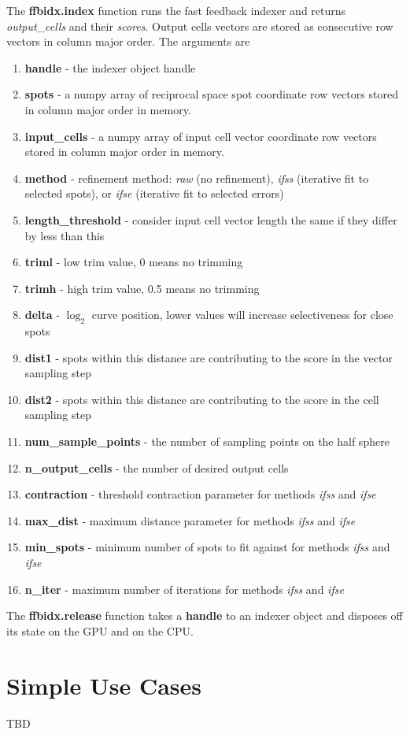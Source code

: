 \documentclass[a4paper,10pt]{article}
\begin{document}
The \textbf{ffbidx.index} function runs the fast feedback indexer and returns \emph{output\_cells} and their \emph{scores}. Output cells vectors are stored as consecutive row vectors in column major order. The arguments are
%
\begin{enumerate}
 \item \textbf{handle} - the indexer object handle
 \item \textbf{spots} - a numpy array of reciprocal space spot coordinate row vectors stored in column major order in memory.
 \item \textbf{input\_cells} - a numpy array of input cell vector coordinate row vectors stored in column major order in memory.
 \item \textbf{method} - refinement method: \emph{raw} (no refinement), \emph{ifss} (iterative fit to selected spots), or \emph{ifse} (iterative fit to selected errors)
 \item \textbf{length\_threshold} - consider input cell vector length the same if they differ by less than this
 \item \textbf{triml} - low trim value, 0 means no trimming
 \item \textbf{trimh} - high trim value, 0.5 means no trimming
 \item \textbf{delta} - $\log_2$ curve position, lower values will increase selectiveness for close spots
 \item \textbf{dist1} - spots within this distance are contributing to the score in the vector sampling step
 \item \textbf{dist2} - spots within this distance are contributing to the score in the cell sampling step
 \item \textbf{num\_sample\_points} - the number of sampling points on the half sphere
 \item \textbf{n\_output\_cells} - the number of desired output cells
 \item \textbf{contraction} - threshold contraction parameter for methods \emph{ifss} and \emph{ifse}
 \item \textbf{max\_dist} - maximum distance parameter for methods \emph{ifss} and \emph{ifse}
 \item \textbf{min\_spots} - minimum number of spots to fit against for methods \emph{ifss} and \emph{ifse}
 \item \textbf{n\_iter} - maximum number of iterations for methods \emph{ifss} and \emph{ifse}
\end{enumerate}
%
The \textbf{ffbidx.release} function takes a \textbf{handle} to an indexer object and disposes off its state on the GPU and on the CPU.

\section{Simple Use Cases}

TBD

\end{document}
